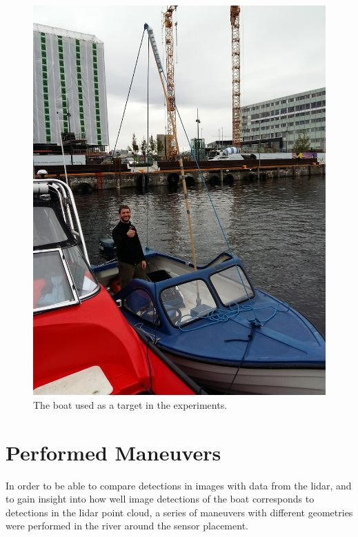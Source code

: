 \begin{figure}
	\centering
	\includegraphics[width=.8\linewidth]{fig/experiment_boat.jpg}
	\caption{The boat used as a target in the experiments.}
	\label{fig:boat}
\end{figure}
\section{Performed Maneuvers}
In order to be able to compare detections in images with data from the lidar, and to gain insight into how well image detections of the boat corresponds to detections in the lidar point cloud, a series of maneuvers with different geometries were performed in the river around the sensor placement.
\cleardoublepage